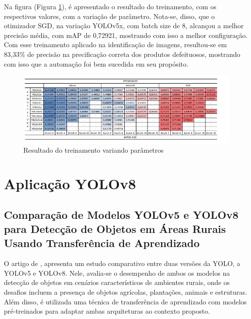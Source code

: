 Na figura (Figura \ref{fig:tabela-macha}), é apresentado o resultado do treinamento, com os respectivos valores, com a variação de parâmetro. Nota-se, disso, que o otimizador SGD, na variação YOLOv5x, com batch size de 8, alcançou a melhor precisão média, com mAP de 0,72921, mostrando com isso a melhor configuração. Com esse treinamento aplicado na identificação de imagens, resultou-se em 83,33\% de precisão na precificação correta dos produtos defeituosos, mostrando com isso que a automação foi bem sucedida em seu propósito.

\begin{figure}[!h]
    \center
    \begin{minipage}{1\linewidth}
        \center
        \captionsetup{justification=centering,margin=0.5cm,font=small}
        \includegraphics[width=1\linewidth]{img/cap3/tabela-mancha.jpeg}
        \caption{Resultado do treinamento variando parâmetros}
        \label{fig:tabela-macha}
    \end{minipage}
\end{figure}

\section{Aplicação YOLOv8}
\subsection{Comparação de Modelos YOLOv5 e YOLOv8 para Detecção de Objetos em Áreas Rurais Usando Transferência de Aprendizado}

O artigo de \cite{diascomparaccao}, apresenta um estudo comparativo entre duas versões da YOLO, a YOLOv5 e YOLOv8. Nele, avalia-se o desempenho de ambos os modelos na detecção de objetos em cenários característicos de ambientes rurais, onde os desafios incluem a presença de objetos agrícolas, plantações, animais e estruturas. Além disso, é utilizada uma técnica de transferência de aprendizado com modelos pré-treinados para adaptar ambas arquiteturas ao contexto proposto.


